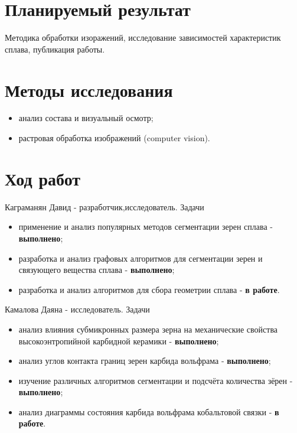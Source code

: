\documentclass[a4paper, 14pt]{article}
\begin{document}
	\section{Планируемый результат}
		Методика обработки изоражений, исследование зависимостей характеристик сплава, публикация работы. 
	 
	 \section{Методы исследования}
	 
	 		\begin{itemize}
	 		\item анализ состава и визуальный осмотр;
	 		
	 		\item растровая обработка изображений (computer vision).
	 		
	 	\end{itemize}
	 
	 \section{Ход работ} 
		Каграманян Давид - разработчик,исследователь. Задачи
		\begin{itemize}
			\item применение и анализ популярных методов сегментации зерен сплава - \textbf{выполнено};
			
			\item разработка и анализ графовых алгоритмов для сегментации зерен и связующего вещества сплава - \textbf{выполнено};
			
			\item разработка и анализ алгоритмов для сбора геометрии сплава - \textbf{в работе}.
		\end{itemize}
	 	
	 	Камалова Даяна - исследователь. Задачи
	 	
	 	\begin{itemize}
	 		\item анализ влияния субмикронных размера зерна на механические свойства высокоэнтропийной карбидной керамики - \textbf{выполнено};
	 		
	 		\item анализ углов контакта границ зерен карбида вольфрама - \textbf{выполнено};
	 		
	 		\item изучение различных алгоритмов сегментации и подсчёта количества зёрен - \textbf{выполнено};
	 			
	 		\item анализ диаграммы состояния карбида вольфрама кобальтовой связки - \textbf{в работе}.
	 		
	 	\end{itemize}
\end{document}

